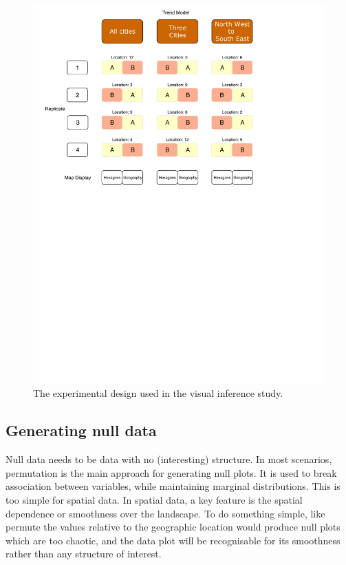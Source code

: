 \documentclass{monashthesis}
\begin{document}
\begin{figure}[H]
\centering
\includegraphics[width=16cm]{figures/04-experiment/experiment_design.pdf}
\caption{\label{fig:exp-design}The experimental design used in the visual inference study.}
\end{figure}

\hypertarget{generating-null-data}{%
\subsection{Generating null data}\label{generating-null-data}}

Null data needs to be data with no (interesting) structure. In most scenarios, permutation is the main approach for generating null plots. It is used to break association between variables, while maintaining marginal distributions. This is too simple for spatial data. In spatial data, a key feature is the spatial dependence or smoothness over the landscape. To do something simple, like permute the values relative to the geographic location would produce null plots which are too chaotic, and the data plot will be recognisable for its smoothness rather than any structure of interest.
\end{document}
